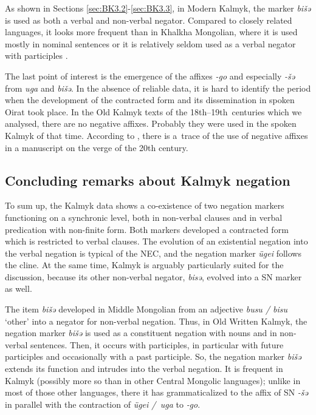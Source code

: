 \documentclass[output=paper]{langsci/langscibook}
\begin{document}
As shown in Sections \ref{sec:BK3.2}-\ref{sec:BK3.3}, in Modern Kalmyk, the marker \textit{bišǝ} is used as both a verbal and non-verbal negator. Compared to closely related languages, it looks more frequent than in Khalkha Mongolian, where it is used mostly in nominal sentences \citep[123--125]{yu1991a} or it is relatively seldom used as a verbal negator with participles \citep[251]{janhunen2012a}.

The last point of interest is the emergence of the affixes \textit{-go} and especially \textit{-šə} from \textit{uga} and \textit{bišə}. In the absence of reliable data, it is hard to identify the period when the development of the contracted form and its dissemination in spoken Oirat took place. In the Old Kalmyk texts of the 18th–19th centuries which we analysed, there are no negative affixes. Probably they were used in the spoken Kalmyk of that time. According to \citet[114]{bembeev2004a}, there is a trace of the use of negative affixes in a manuscript on the verge of the 20th century.


\subsection{Concluding remarks about Kalmyk negation}\label{sec:BK3.5}

To sum up, the Kalmyk data shows a co-existence of two negation markers functioning on a synchronic level, both in non-verbal clauses and in verbal predication with non-finite form. Both markers developed a contracted form which is restricted to verbal clauses. The evolution of an existential negation into the verbal negation is typical of the NEC, and the negation marker \textit{ügei} follows the cline. At the same time, Kalmyk is arguably particularly suited for the discussion, because its other non-verbal negator, \textit{bisə}, evolved into a SN marker as well.

The item \textit{bišǝ} developed in Middle Mongolian from an adjective \textit{busu / bisu} ‘other’ into a negator for non-verbal negation. Thus, in Old Written Kalmyk, the negation marker \textit{bišǝ} is used as a constituent negation with nouns and in non-verbal sentences. Then, it occurs with participles, in particular with future participles and occasionally with a past participle. So, the negation marker \textit{bišǝ} extends its function and intrudes into the verbal negation. It is frequent in Kalmyk (possibly more so than in other Central Mongolic languages); unlike in most of those other languages, there it has grammaticalized to the affix of SN \textit{-šǝ} in parallel with the contraction of \textit{ügei / uga} to \textit{‑go}.
\end{document}
